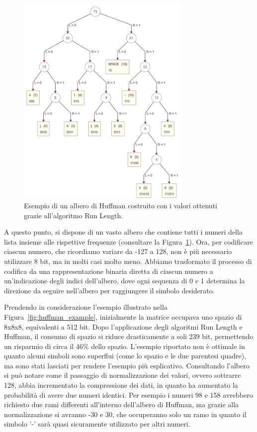 \documentclass[a4paper,12pt, oneside]{article}
\begin{document}
\begin{figure}[h]
    \centering
    \includegraphics[width=0.75\textwidth]{images/huffman-tree.png}
    \caption{Esempio di un albero di Huffman costruito con i valori ottenuti grazie all'algoritmo
    Run Length.}
    \label{fig:huffman_tree}
\end{figure}

\noindent A questo punto, si dispone di un vasto albero che contiene tutti i numeri della lista insieme alle
rispettive frequenze (consultare la Figura~\ref{fig:huffman_tree}). Ora, per codificare ciascun numero,
che ricordiamo variare da -127 a 128, non è più necessario utilizzare 8 bit, ma in molti casi molto
meno. Abbiamo trasformato il processo di codifica da una rappresentazione binaria diretta di ciascun
numero a un'indicazione degli indici dell'albero, dove ogni sequenza di 0 e 1 determina la direzione
da seguire nell'albero per raggiungere il simbolo desiderato.

Prendendo in considerazione l'esempio illustrato nella Figura~\ref{fig:huffman_example}, inizialmente
la matrice occupava uno spazio di 8x8x8, equivalenti a 512 bit. Dopo l'applicazione degli algoritmi
Run Length e Huffman, il consumo di spazio si riduce drasticamente a soli 239 bit, permettendo un
risparmio di circa il 46\% dello spazio. L'esempio riportato non è ottimale in quanto alcuni simboli
sono superflui (come lo spazio e le due parentesi quadre), ma sono stati lasciati per rendere
l'esempio più esplicativo. Consultando l'albero si può notare come il passaggio di normalizzazione
dei valori, ovvero sottrarre 128, abbia incrementato la compressione dei dati, in quanto ha aumentato
la probabilità di avere due numeri identici. Per esempio i numeri 98 e 158 avrebbero richiesto due
rami differenti all'interno dell'albero di Huffman, ma grazie alla normalizzazione si avranno -30 e
30, che occuperanno solo un ramo in quanto il simbolo '-' sarà quasi sicuramente utilizzato per altri
numeri.
\end{document}
